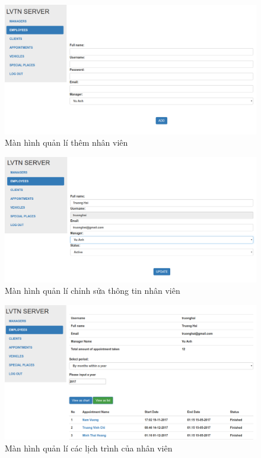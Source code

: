 \documentclass{article}
\begin{document}
\begin{figure}[H]
\centering
\includegraphics[scale=0.5]{admin_themnhanvien}
\caption{Màn hình quản lí thêm nhân viên}
\end{figure}

\begin{figure}[H]
\centering
\includegraphics[scale=0.5]{admin_chinhsuanhanvien}
\caption{Màn hình quản lí chỉnh sửa thông tin nhân viên}
\end{figure}

\begin{figure}[H]
\centering
\includegraphics[scale=0.5]{admin_lichtrinh}
\caption{Màn hình quản lí các lịch trình của nhân viên}
\end{figure}
\end{document}
